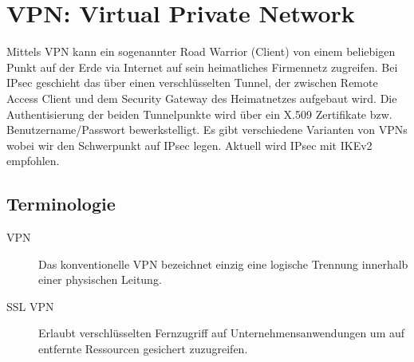 \section{VPN: Virtual Private Network}
Mittels VPN kann ein sogenannter Road Warrior (Client) von einem beliebigen Punkt auf der Erde via Internet auf sein heimatliches Firmennetz zugreifen. Bei IPsec geschieht das über einen verschlüsselten Tunnel, der zwischen Remote Access Client und dem Security Gateway des Heimatnetzes aufgebaut wird. Die Authentisierung der beiden Tunnelpunkte wird über ein X.509 Zertifikate bzw. Benutzername/Passwort bewerkstelligt. Es gibt verschiedene Varianten von VPNs wobei wir den Schwerpunkt auf IPsec legen. Aktuell wird IPsec mit IKEv2 empfohlen.

\subsection{Terminologie}
\begin{description}
	\item[VPN] Das konventionelle VPN bezeichnet einzig eine logische Trennung innerhalb einer physischen Leitung. 
	\item[SSL VPN] Erlaubt verschlüsselten Fernzugriff auf Unternehmensanwendungen um auf entfernte Ressourcen gesichert zuzugreifen.
\end{description}

